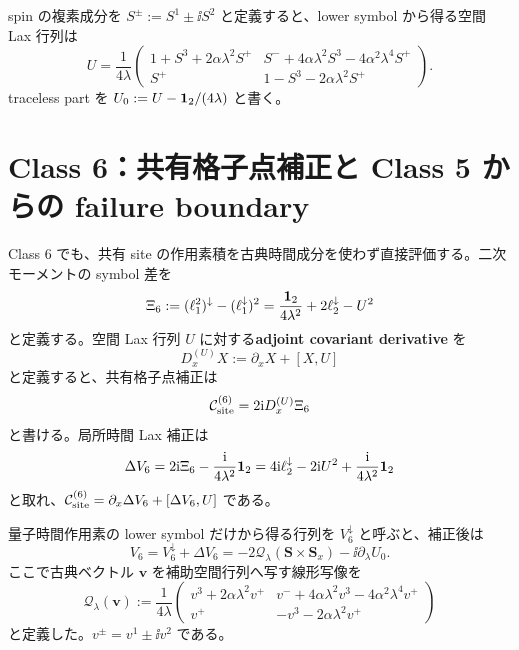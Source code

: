 spin の複素成分を $S^\pm:=S^1\pm\ii S^2$ と定義すると、lower symbol から得る空間 Lax 行列は
\begin{equation}
U=\frac1{4\lambda}
\begin{pmatrix}
1+S^3+2\alpha\lambda^2S^+&
S^-+4\alpha\lambda^2S^3-4\alpha^2\lambda^4S^+\\
S^+&1-S^3-2\alpha\lambda^2S^+
\end{pmatrix}.
\label{eq:C6U}
\end{equation}
traceless part を $U_0:=U-\mathbf 1_{2}/(4\lambda)$ と書く。

\section{Class 6：共有格子点補正と Class 5 からの failure boundary}
Class 6 でも、共有 site の作用素積を古典時間成分を使わず直接評価する。二次モーメントの symbol 差を
\begin{equation}
\Xi_6:=(\ell_1^2)^\downarrow-(\ell_1^\downarrow)^2
=\frac{\mathbf 1_{2}}{4\lambda^2}+2\ell_2^\downarrow-U^2
\label{eq:Xi6}
\end{equation}
と定義する。空間 Lax 行列 $U$ に対する\textbf{adjoint covariant derivative} を
\begin{equation}
D_x^{(U)}X:=\partial_xX+[X,U]
\label{eq:Dadj}
\end{equation}
と定義すると、共有格子点補正は
\begin{equation}
\mathcal C_{\rm site}^{(6)}=2\mathrm i D_x^{(U)}\Xi_6
\label{eq:Csite6}
\end{equation}
と書ける。局所時間 Lax 補正は
\begin{equation}
\Delta V_6=2\mathrm i\Xi_6-\frac{\mathrm i}{4\lambda^2}\mathbf 1_{2}
=4\mathrm i\ell_2^\downarrow-2\mathrm i U^2+\frac{\mathrm i}{4\lambda^2}\mathbf 1_{2}
\label{eq:DeltaV6}
\end{equation}
と取れ、$\mathcal C_{\rm site}^{(6)}=\partial_x\Delta V_6+[\Delta V_6,U]$ である。

量子時間作用素の lower symbol だけから得る行列を $V_6^\downarrow$ と呼ぶと、補正後は
\begin{equation}
V_6=V_6^\downarrow+\Delta V_6
=-2\mathcal Q_\lambda(\boldsymbol S\times\boldsymbol S_x)-\ii\partial_\lambda U_0.
\label{eq:C6Vfinal}
\end{equation}
ここで古典ベクトル $\boldsymbol v$ を補助空間行列へ写す線形写像を
\begin{equation}
\mathcal Q_\lambda(\boldsymbol v):=\frac1{4\lambda}
\begin{pmatrix}
v^3+2\alpha\lambda^2v^+&v^-+4\alpha\lambda^2v^3-4\alpha^2\lambda^4v^+\\
v^+&-v^3-2\alpha\lambda^2v^+
\end{pmatrix}
\label{eq:Qmap6}
\end{equation}
と定義した。$v^\pm=v^1\pm\ii v^2$ である。

